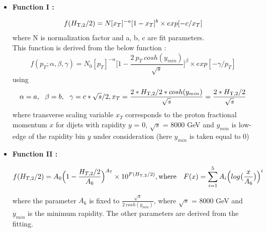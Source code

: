\begin{itemize}
\item {\bf Function I : }

  \begin{equation}
    \label{eq:func1}
    f(H_{\mathrm{T,2}}/2) = N[x_{T}]^{-a}[1-x_{T}]^{b} \times exp[-c/x_{T}]
  \end{equation}
  where N is normalization factor and a, b, c are fit parameters.\\

  This function is derived from the below function \cite{CMS:2011ab} :
  \begin{equation}
    \label{eq:funcderive}
    f(p_{T};\alpha,\beta,\gamma) = N_{0}[p_{T}]^{-\alpha}\bigg[1-\frac{2~p_{T}~cosh(y_{min})}{\sqrt{s}}\bigg]^{\beta} \times exp[-\gamma/p_{T}]
  \end{equation}
  using 
  \begin{equation}
    \alpha = a,~~\beta = b,~~\gamma = c*\sqrt{s}/2, \\
    x_{T} = \frac{2*\httwons *cosh(y_{min})}{\sqrt{s}} = \frac{2*\httwons}{\sqrt{s}}
  \end{equation}
  where transverse scaling variable $x_{T}$ corresponds to the proton fractional momentum $x$ for dijets with rapidity $y$ = 0, $\sqrt{s}$ = 8000 GeV and $y_{min}$ is low-edge of the rapidity bin $y$ under consideration (here $y_{min}$ is taken equal to 0)
  
\item {\bf Function II : }

  \begin{equation}
    \label{eq:func2}
    f(H_{T,2}/2) = A_{0}\Big(1-\frac{H_{T,2}/2}{A_{6}}\Big)^{A_{7}} \times 10^{F(\httwo)}, {\rm where} ~~~{F(x) = \sum\limits_{i=1}^5 A_{i}\Big(log\big(\frac{x}{A_{6}}\big)\Big)^{i}}
  \end{equation}

  where the parameter $A_{6}$ is fixed to $\frac{\sqrt{s}}{2~cosh(y_{min})}$, where $\sqrt{s}$ = 8000 GeV and $y_{min}$ is 
  the minimum rapidity. The other parameters are derived from the fitting.
\end{itemize}

